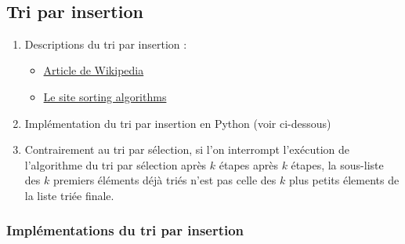 \documentclass[11pt]{article}
\providecommand{\tightlist}{%
      \setlength{\itemsep}{0pt}\setlength{\parskip}{0pt}}
\begin{document}
    \begin{center}
    \end{center}
    { \hspace*{\fill} \\}
    
    \subsection{Tri par insertion}\label{tri-par-insertion}

    \begin{enumerate}
\def\labelenumi{\arabic{enumi}.}
\item
  Descriptions du tri par insertion :

  \begin{itemize}
  \tightlist
  \item
    \href{http://fr.wikipedia.org/wiki/Tri_par_insertion}{Article de
    Wikipedia}
  \item
    \href{http://www.sorting-algorithms.com/insertion-sort}{Le site
    sorting algorithms}
  \end{itemize}
\item
  Implémentation du tri par insertion en Python (voir ci-dessous)
\item
  Contrairement au tri par sélection, si l'on interrompt l'exécution de
  l'algorithme du tri par sélection après \(k\) étapes après \(k\)
  étapes, la sous-liste des \(k\) premiers éléments déjà triés n'est pas
  celle des \(k\) plus petits élements de la liste triée finale.
\end{enumerate}

    \subsubsection{Implémentations du tri par
insertion}\label{impluxe9mentations-du-tri-par-insertion}
\end{document}
